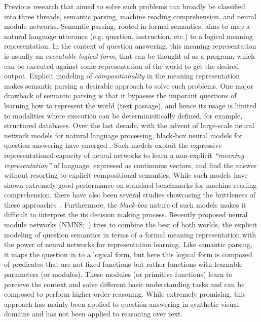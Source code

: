 \documentclass[main.tex]{subfiles}
\begin{document}
Previous research that aimed to solve such problems can broadly be classified into three threads, semantic parsing, machine reading comprehension, and neural module networks.  Semantic parsing, rooted in formal semantics, aims to map a natural language utterance (e.g. question, instruction, etc.) to a logical meaning representation.  In the context of question answering, this meaning representation is usually an \textit{executable logical form}, that can be thought of as a program, which can be executed against some representation of the world to get the desired output.  Explicit modeling of \textit{compositionality} in the meaning representation makes semantic parsing a desirable approach to solve such problems.
One major drawback of semantic parsing is that it bypasses the imporant questions of learning how to represent the world (text passage), and hence its usage is limited to modalities where execution can be determinisitically defined, for example, structured databases.
Over the last decade, with the advent of large-scale neural network models for natural language processing, black-box neural models for question answering have emerged \cite{bidaf-2016,qanet-2018,bert-2018}.
Such models exploit the expressive representational capacity of neural networks to learn a non-explicit \textit{``meaning representation''} of language, expressed as continuous vectors, and find the answer without resorting to explicit compositional semantics.  While such models have shown extremely good performance on standard benchmarks for machine reading comprehension, there have also been several studies showcasing the brittleness of these approaches~\cite{adversarial-squad-2017,sears-2018,pathologies-nlp-2018}.  Furthermore, the \textit{black-box} nature of such models makes it difficult to interpret the its decision making process.
Recently proposed neural module networks (NMNS;~) tries to combine the best of both worlds, the explicit modeling of question semantics in terms of a formal meaning representation with the power of neural networks for representation learning.  Like semantic parsing, it maps the question in to a logical form, but here this logical form is composed of predicates that are not fixed functions but rather functions with learnable parameters (or modules).  These modules (or primitive functions) learn to percieve the context and solve different basic understanding tasks and can be composed to perform higher-order reasoning.  While extremely promising, this approach has mainly been applied to question answering in synthetic visual domains and has not been applied to reasoning over text.
\end{document}
